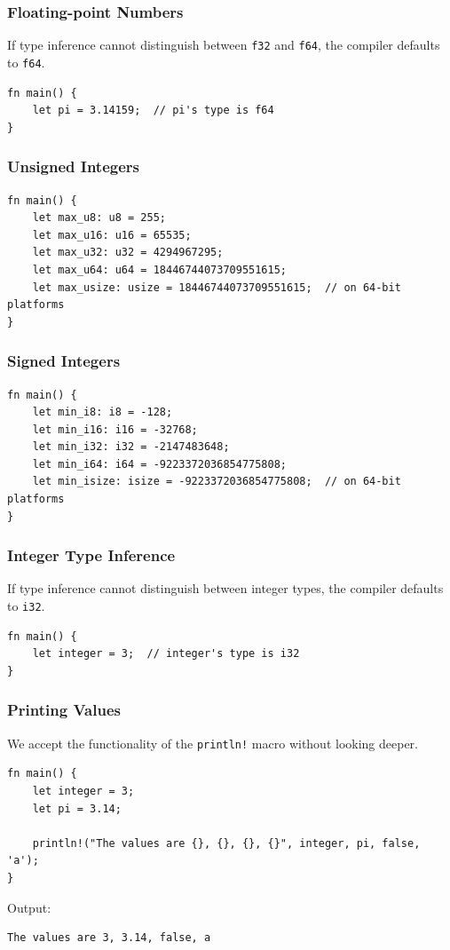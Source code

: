 \documentclass[aspectratio=169]{beamer}
\begin{document}
\begin{frame}[fragile]
    \frametitle{Floating-point Numbers}
    If type inference cannot distinguish between \texttt{f32} and \texttt{f64}, the compiler defaults to \texttt{f64}.
    \pause
    \begin{verbatim}
fn main() {
    let pi = 3.14159;  // pi's type is f64
}
    \end{verbatim}
\end{frame}

\begin{frame}[fragile]
    \frametitle{Unsigned Integers}
    \begin{verbatim}
fn main() {
    let max_u8: u8 = 255;
    let max_u16: u16 = 65535;
    let max_u32: u32 = 4294967295;
    let max_u64: u64 = 18446744073709551615;
    let max_usize: usize = 18446744073709551615;  // on 64-bit platforms
}
    \end{verbatim}
\end{frame}

\begin{frame}[fragile]
    \frametitle{Signed Integers}
    \begin{verbatim}
fn main() {
    let min_i8: i8 = -128;
    let min_i16: i16 = -32768;
    let min_i32: i32 = -2147483648;
    let min_i64: i64 = -9223372036854775808;
    let min_isize: isize = -9223372036854775808;  // on 64-bit platforms
}
    \end{verbatim}
\end{frame}

\begin{frame}[fragile]
    \frametitle{Integer Type Inference}
    If type inference cannot distinguish between integer types, the compiler defaults to \texttt{i32}.
    \pause
    \begin{verbatim}
fn main() {
    let integer = 3;  // integer's type is i32
}
    \end{verbatim}
\end{frame}

\begin{frame}[fragile]
    \frametitle{Printing Values}
    We accept the functionality of the \texttt{println!} macro without looking deeper.
    \pause
    \begin{verbatim}
fn main() {
    let integer = 3;
    let pi = 3.14;

    println!("The values are {}, {}, {}, {}", integer, pi, false, 'a');
}
    \end{verbatim}
    \pause
    Output:
    \begin{verbatim}
The values are 3, 3.14, false, a
    \end{verbatim}
\end{frame}
\end{document}
